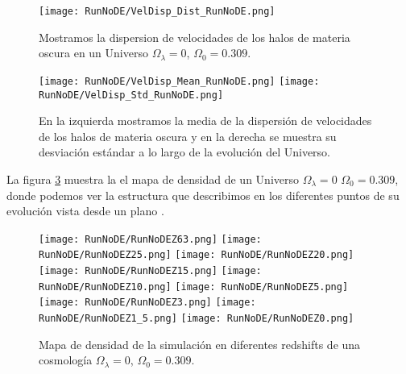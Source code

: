\begin{figure}[H]
    \centering
    \texttt{[image: RunNoDE/VelDisp\_Dist\_RunNoDE.png]}
    \caption[Distribución de la dispersión de velocidades de un Universo $\Omega_\lambda = 0$, $\Omega_0 = 0.309$]{\footnotesize Mostramos la dispersion de velocidades de los halos de materia oscura en un Universo $\Omega_\lambda = 0$, $\Omega_0 = 0.309$.}
    \label{fig:NoDE-VelDispDist}
\end{figure}

\begin{figure}[H]
    \centering
    \texttt{[image: RunNoDE/VelDisp\_Mean\_RunNoDE.png]}
    \texttt{[image: RunNoDE/VelDisp\_Std\_RunNoDE.png]}
    \caption[Media y desviación estándar de la dispersión de velocidades de un Universo $\Omega_\lambda = 0$, $\Omega_0 = 0.309$]{\footnotesize En la izquierda mostramos la media de la dispersión de velocidades de los halos de materia oscura y en la derecha se muestra su desviación estándar a lo largo de la evolución del Universo.}
    \label{fig:NoDE-VelDispStats}
\end{figure}

La figura \ref{fig:NoDE-DensityMap} muestra la el mapa de densidad de un Universo $\Omega_\lambda = 0$ $\Omega_0 = 0.309$, donde podemos ver la estructura que describimos  en los diferentes puntos de su evolución vista desde un plano .
\begin{figure}[H]
    \centering

    \texttt{[image: RunNoDE/RunNoDEZ63.png]}   %
    \texttt{[image: RunNoDE/RunNoDEZ25.png]}   %
    \texttt{[image: RunNoDE/RunNoDEZ20.png]}   %
    \\
    \texttt{[image: RunNoDE/RunNoDEZ15.png]}   %
    \texttt{[image: RunNoDE/RunNoDEZ10.png]}   %
    \texttt{[image: RunNoDE/RunNoDEZ5.png]}    %
    \\
    \texttt{[image: RunNoDE/RunNoDEZ3.png]}    %
    \texttt{[image: RunNoDE/RunNoDEZ1\_5.png]}  %
    \texttt{[image: RunNoDE/RunNoDEZ0.png]}    %
    \caption[Mapa de densidad de un Universo $\Omega_\lambda = 0$, $\Omega_0 = 0.309$ en en diferentes redshift]{ \footnotesize Mapa de densidad de la simulación en diferentes redshifts de una cosmología $\Omega_\lambda = 0$, $\Omega_0 = 0.309$. }
    \label{fig:NoDE-DensityMap}
\end{figure}

